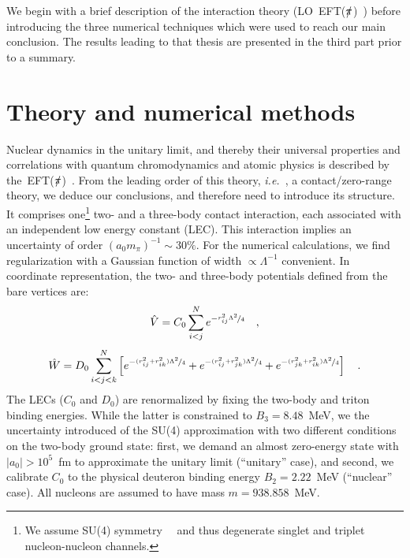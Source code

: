 \documentclass[5p,times]{elsarticle}
\newcommand{\ie}{\textit{i.e.}~}
\newcommand{\eftnopi}{\mbox{EFT($\slashed{\pi}$) }}
\begin{document}
We begin with a brief description of the interaction theory (LO~\eftnopi) before introducing the
three numerical techniques which were used to reach our main conclusion. The results leading to that
thesis are presented in the third part prior to a summary.


\section{Theory and numerical methods}

Nuclear dynamics in the unitary limit, and thereby their universal properties
and correlations with quantum chromodynamics and atomic
physics is described by the~\eftnopi\cite{vanKolck:1999mw}.
From the leading order of this theory, \ie, a contact/zero-range theory,
we deduce our conclusions, and therefore need to introduce its structure. 
It comprises one\footnote{We assume SU(4) symmetry~\cite{Konig:2016utl}~
and thus degenerate singlet and triplet nucleon-nucleon channels.}
two- and a three-body contact interaction, each 
associated with an independent low energy constant (LEC).
This interaction implies an uncertainty of order $(a_0m_{\pi})^{-1}\sim30\%$.
For the numerical calculations, we find regularization 
with a Gaussian function of width $\propto\Lambda^{-1}$ convenient.
In coordinate representation, the two- and three-body
potentials defined from the bare vertices are:
%
\begin{equation}
    \hat{V}=C_0 \sum_{i<j}^N e^{-\nicefrac{r_{ij}^2\Lambda^2}{4}}
    \quad,
\label{eq:vnn}
\end{equation}
%
\begin{equation}
    \hat{W}=D_0 \sum_{i<j<k}^N \left[
    e^{-\nicefrac{(r_{ij}^2+r_{ik}^2)\Lambda^2}{4}}+
    e^{-\nicefrac{(r_{ij}^2+r_{jk}^2)\Lambda^2}{4}}+
    e^{-\nicefrac{(r_{jk}^2+r_{ik}^2)\Lambda^2}{4}}\right]
    \quad.
\label{eq:vnnn}
\end{equation}
%
The LECs ($C_0$ and $D_0$) are renormalized by fixing the two-body
and triton binding energies.
While the latter is constrained to $B_3=8.48$~MeV, 
we the uncertainty introduced of the SU(4) approximation with two
different conditions on the two-body ground state:
first, we demand an almost zero-energy state with $|a_0|>10^5$~fm to
approximate the unitary limit
(``unitary'' case), and second, we calibrate $C_0$ to the physical deuteron
binding energy $B_2=2.22$~MeV
(``nuclear'' case). All nucleons are assumed to have mass $m=938.858$~MeV.
\end{document}

